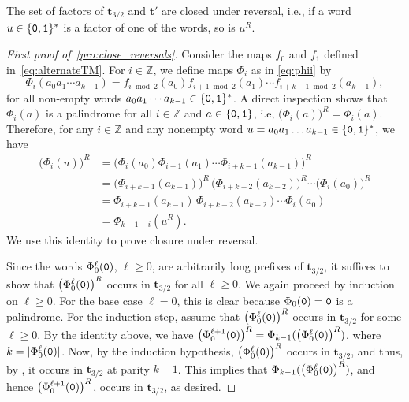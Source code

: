 \documentclass[12pt,reqno]{article}
\newcommand{\cA}{\{{\tt 0},{\tt 1}\}}
\newcommand{\Z}{\mathbb{Z}}
\begin{document}
\begin{proposition}
    \label{pro:close_reversals}
    The set of factors of $\mathbf{t}_{3/2}$ and $\mathbf{t}'$ are closed under reversal,  i.e.,  if a word $u\in\cA^*$ is a factor of one of the words,  so is $u^R$.
\end{proposition}
\begin{proof}[First proof of~\cref{pro:close_reversals}]
    Consider the maps $f_0$ and $f_1$ defined in~\eqref{eq:alternateTM}.
    For $i \in \Z$, we define maps $\Phi_i$ as in \eqref{eq:phii} by
    \begin{equation*}
        \Phi_i(a_0 a_1 \cdots a_{k-1}) = f_{i\bmod{2}}(a_0) f_{{i+1}\bmod{2}}(a_1) \cdots f_{{i+k-1}\bmod{2}}(a_{k-1}),
    \end{equation*}
    for all non-empty words $a_0 a_1 \cdots a_{k-1} \in \cA^*$.
    A direct inspection shows that $\Phi_i(a)$ is a palindrome for all $i \in \Z$ and $a \in \{{\tt 0}, {\tt 1}\}$,  i.e,  $\big(\Phi_i(a)\big)^R = \Phi_i(a)$.
    Therefore, for any $i \in \Z$ and any nonempty word $u = a_0a_1\dots a_{k-1} \in \{{\tt 0}, {\tt 1}\}^*$, we have 
    \begin{align*}
        \big(\Phi_i(u)\big)^R &= 
        \big(\Phi_i(a_0) \Phi_{i+1}(a_1) \cdots \Phi_{i+k-1}(a_{k-1})\big)^R \\ &= 
        \big(\Phi_{i+k-1}(a_{k-1})\big)^R\, \big(\Phi_{i+k-2}(a_{k-2})\big)^R \cdots \big(\Phi_i(a_0)\big)^R \\ &=
        \Phi_{i+k-1}(a_{k-1}) \,\Phi_{i+k-2}(a_{k-2}) \cdots \Phi_i(a_0) \\ &=
        \Phi_{k-1-i}(u^R).
    \end{align*}
    We use this identity to prove closure under reversal.

    Since the words $\Phi_0^\ell({\tt 0})$, $\ell \ge 0$, are arbitrarily long prefixes of $\mathbf{t}_{3/2}$, it suffices to show that $ \big(\Phi_0^\ell({\tt 0})\big)^R$ occurs in $\mathbf{t}_{3/2}$ for all $\ell \ge 0$.
    We again proceed by induction on $\ell\ge 0$.
    For the base case $\ell = 0$,  this is clear because $\Phi_0({\tt 0}) = {\tt 0}$ is a palindrome.
    For the induction step,  assume that $ \big(\Phi_0^\ell({\tt 0})\big)^R$ occurs in $\mathbf{t}_{3/2}$ for some $\ell \ge 0$.
    By the identity above, we have
    $\big(\Phi_0^{\ell+1}({\tt 0})\big)^R = \Phi_{k-1}( \big(\Phi_0^\ell({\tt 0}) \big)^R)$,
    where $k = |\Phi_0^\ell({\tt 0})|$.
    Now, by the induction hypothesis, $ \big(\Phi_0^\ell({\tt 0}) \big)^R$ occurs in $\mathbf{t}_{3/2}$, and thus, by , it occurs in $\mathbf{t}_{3/2}$ at parity $k-1$.
    This implies that $\Phi_{k-1}( \big(\Phi_0^\ell({\tt 0}) \big)^R)$, and hence $\big(\Phi_0^{\ell+1}({\tt 0})\big)^R$, occurs in $\mathbf{t}_{3/2}$,  as desired.
\end{proof}
\end{document}
